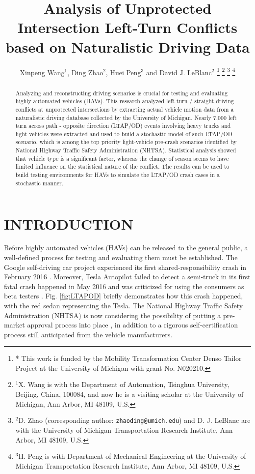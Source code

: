 \documentclass[letterpaper, 10 pt, conference]{ieeeconf}
\title{\LARGE \bf
Analysis of Unprotected Intersection Left-Turn Conflicts based on Naturalistic Driving Data
}
\author{Xinpeng Wang$^{1}$, Ding Zhao$^{2}$, Huei Peng$^{3}$ and David J. LeBlanc$^{2}$%
\thanks{* This work is funded by the Mobility Transformation Center Denso Tailor Project at the University of Michigan with grant No. N020210.}%
\thanks{$^{1}$X. Wang is with the Department of Automation, Tsinghua University, Beijing, China, 100084, and now he is a visiting scholar at the University of Michigan, Ann Arbor, MI 48109, U.S. 
        }%
\thanks{$^{2}$D. Zhao (corresponding author: {\tt\small zhaoding@umich.edu}) and D. J. LeBlanc are with the University of Michigan Transportation Research Institute, Ann Arbor, MI 48109, U.S.}%
\thanks{$^{3}$H. Peng is with Department of Mechanical Engineering at the University of Michigan Transportation Research Institute, Ann Arbor, MI 48109, U.S.}%
}
\begin{document}
\maketitle
\thispagestyle{empty}
\pagestyle{empty}

\begin{abstract}
Analyzing and reconstructing driving scenarios is crucial for testing and evaluating highly automated vehicles (HAVs). This research analyzed left-turn / straight-driving conflicts at unprotected intersections by extracting actual vehicle motion data from a naturalistic driving database collected by the University of Michigan. Nearly 7,000 left turn across path - opposite direction (LTAP/OD) events involving heavy trucks and light vehicles were extracted and used to build a stochastic model of such LTAP/OD scenario, which is among the top priority light-vehicle pre-crash scenarios identified by National Highway Traffic Safety Administration (NHTSA). Statistical analysis showed that vehicle type is a significant factor, whereas the change of season seems to have limited influence on the statistical nature of the conflict. The results can be used to build testing environments for HAVs to simulate the LTAP/OD crash cases in a stochastic manner.
% 
%
%
\end{abstract}
\section{INTRODUCTION}
Before highly automated vehicles (HAVs) can be released to the general public, a well-defined process for testing and evaluating them must be established. The Google self-driving car project experienced 
its first shared-responsibility crash in February 2016 \cite{GoogleAutoLLC2016}. Moreover, Tesla Autopilot failed to detect a semi-truck in its first fatal crash happened in May 2016 and was criticized for using the consumers as beta testers \cite{TheinsideofaTeslavehicleatashowroominRedHook}. Fig. \ref{fig:LTAPOD} briefly demonstrates how this crash happened, with the red sedan representing the Tesla. The National Highway Traffic Safety Administration (NHTSA) is now considering the possibility of putting a pre-market approval process into place \cite{U.S.DepartmentofTransportation2016}%
, in addition to a rigorous self-certification process still anticipated from the vehicle manufacturers. 
\end{document}
